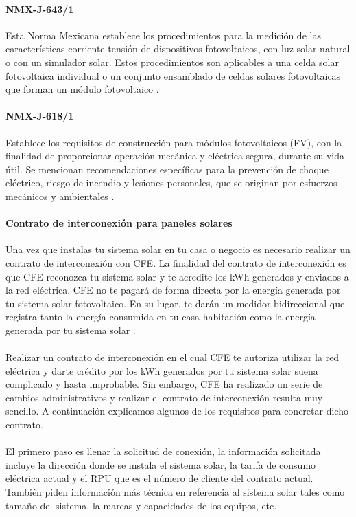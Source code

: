 \paragraph{NMX-J-643/1}
Esta Norma Mexicana establece los procedimientos para la medición de las
características corriente-tensión de dispositivos fotovoltaicos,
con luz solar natural o con un simulador solar. Estos
procedimientos son aplicables a una celda solar fotovoltaica
individual o un conjunto ensamblado de celdas solares
fotovoltaicas que forman un módulo fotovoltaico \citep{NMX-J-643/1}.

\paragraph{NMX-J-618/1}
Establece los requisitos de construcción para módulos fotovoltaicos (FV), con la finalidad de proporcionar operación mecánica y eléctrica segura, durante su vida útil. Se mencionan recomendaciones específicas para la prevención de choque eléctrico, riesgo de incendio y lesiones personales, que se originan por esfuerzos mecánicos y ambientales \citep{NMX-J-618/1}.

\paragraph{Contrato de interconexión para paneles solares}

Una vez que instalas tu sistema solar en tu casa o negocio es necesario realizar un contrato de interconexión con CFE. La finalidad del contrato de interconexión es que CFE reconozca tu sistema solar y te acredite los kWh generados y enviados a la red eléctrica. CFE no te pagará de forma directa por la energía generada por tu sistema solar fotovoltaico. En su lugar, te darán un medidor bidireccional que registra tanto la energía consumida en tu casa habitación como la energía generada por tu sistema solar \citep{ContratoSolar}.
\paragraph{}
Realizar un contrato de interconexión en el cual CFE te autoriza utilizar la red eléctrica y darte crédito por los kWh generados por tu sistema solar suena complicado y hasta improbable. Sin embargo, CFE ha realizado un serie de cambios administrativos y realizar el contrato de interconexión resulta muy sencillo. A continuación explicamos algunos de los requisitos para concretar dicho contrato.
\paragraph{}
El primero paso es llenar la solicitud de conexión, la información solicitada incluye la dirección donde se instala el sistema solar, la tarifa de consumo eléctrica actual y el RPU que es el número de cliente del contrato actual. También piden información más técnica en referencia al sistema solar tales como tamaño del sistema, la marcas y capacidades de los equipos, etc.
